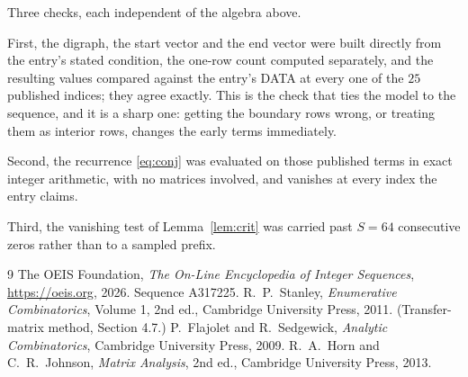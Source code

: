 \documentclass[11pt,a4paper]{article}
\theoremstyle{plain}
\theoremstyle{definition}
\begin{document}
Three checks, each independent of the algebra above.

First, the digraph, the start vector and the end vector were built directly from the
entry's stated condition, the one-row count computed separately, and the resulting values
compared against the entry's DATA at every one of the $25$ published indices; they
agree exactly. This is the check that ties the model to the sequence, and it is a sharp one:
getting the boundary rows wrong, or treating them as interior rows, changes the early terms
immediately.

Second, the recurrence \eqref{eq:conj} was evaluated on those published terms in exact
integer arithmetic, with no matrices involved, and vanishes at every index the entry claims.

Third, the vanishing test of Lemma~\ref{lem:crit} was carried past $S=64$ consecutive
zeros rather than to a sampled prefix.

\begin{thebibliography}{9}
 The OEIS Foundation, \emph{The On-Line Encyclopedia of Integer
Sequences}, \url{https://oeis.org}, 2026. Sequence A317225.
 R.~P.~Stanley, \emph{Enumerative Combinatorics}, Volume 1, 2nd ed.,
Cambridge University Press, 2011. (Transfer-matrix method, Section 4.7.)
 P.~Flajolet and R.~Sedgewick, \emph{Analytic Combinatorics}, Cambridge
University Press, 2009.
 R.~A.~Horn and C.~R.~Johnson, \emph{Matrix Analysis}, 2nd ed., Cambridge
University Press, 2013.
\end{thebibliography}
\end{document}

